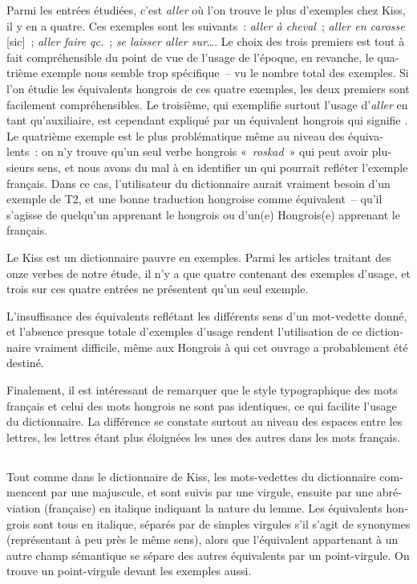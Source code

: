 \documentclass[output=paper,colorlinks,citecolor=brown,arabicfont,chinesefont,booklanguage=french]{langscibook}
\begin{document}
\begin{otherlanguage}{french}
Parmi les entrées étudiées, c’est \emph{aller} où l’on trouve le plus d’exemples chez Kiss, il y en a quatre. Ces exemples sont les suivants~: \emph{aller à cheval}~; \emph{aller en carosse} [sic]~; \emph{aller faire qc.}~; \emph{se laisser aller sur}…. Le choix des trois premiers est tout à fait compréhensible du point de vue de l’usage de l’époque, en revanche, le quatrième exemple nous semble trop spécifique~-- vu le nombre total des exemples. Si l’on étudie les équivalents hongrois de ces quatre exemples, les deux premiers sont facilement compréhensibles. Le troisième, qui exemplifie surtout l’usage d’\emph{aller} en tant qu’auxiliaire, est cependant expliqué par un équivalent hongrois qui signifie . Le quatrième exemple est le plus problématique même au niveau des équivalents~: on n’y trouve qu’un seul verbe hongrois «~\emph{roskad}~» qui peut avoir plusieurs sens, et nous avons du mal à en identifier un qui pourrait refléter l’exemple français. Dans ce cas, l’utilisateur du dictionnaire aurait vraiment besoin d’un exemple de T2, et une bonne traduction hongroise comme équivalent~-- qu’il s’agisse de quelqu’un apprenant le hongrois ou d’un(e) Hongrois(e) apprenant le français.

Le Kiss est un dictionnaire pauvre en exemples. Parmi les articles traitant des onze verbes de notre étude, il n’y a que quatre contenant des exemples d’usage, et trois sur ces quatre entrées ne présentent qu’un seul exemple.

L’insuffisance des équivalents reflétant les différents sens d’un mot-vedette donné, et l’absence presque totale d'exemples d’usage rendent l’utilisation de ce dictionnaire vraiment difficile, même aux Hongrois à qui cet ouvrage a probablement été destiné.

Finalement, il est intéressant de remarquer que le style typographique des mots français et celui des mots hongrois ne sont pas identiques, ce qui facilite l’usage du dictionnaire. La différence se constate surtout au niveau des espaces entre les lettres, les lettres étant plus éloignées les unes des autres dans les mots français.

\subsection{\citealt{Babos1865} }\label{sec:tillinger:3.2}

Tout comme dans le dictionnaire de Kiss, les mots-vedettes du dictionnaire commencent par une majuscule, et sont suivis par une virgule, ensuite par une abréviation (française) en italique indiquant la nature du lemme. Les équivalents hongrois sont tous en italique, séparés par de simples virgules s’il s’agit de synonymes (représentant à peu près le même sens), alors que l’équivalent appartenant à un autre champ sémantique se sépare des autres équivalents par un point-virgule. On trouve un point-virgule devant les exemples aussi. 


\end{otherlanguage}
\end{document}
